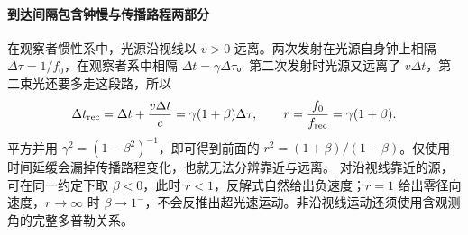 \paragraph{到达间隔包含钟慢与传播路程两部分}
在观察者惯性系中，光源沿视线以 $v>0$ 远离。两次发射在光源自身钟上相隔 $\Delta\tau=1/f_0$，在观察者系中相隔 $\Delta t=\gamma\Delta\tau$。第二次发射时光源又远离了 $v\Delta t$，第二束光还要多走这段路，所以
\[
 \Delta t_{\rm rec}=\Delta t+\frac{v\Delta t}{c}
 =\gamma(1+\beta)\Delta\tau,\qquad
 r=\frac{f_0}{f_{\rm rec}}=\gamma(1+\beta).
\]
平方并用 $\gamma^2=(1-\beta^2)^{-1}$，即可得到前面的 $r^2=(1+\beta)/(1-\beta)$。仅使用时间延缓会漏掉传播路程变化，也就无法分辨靠近与远离。
对沿视线靠近的源，可在同一约定下取 $\beta<0$，此时 $r<1$，反解式自然给出负速度；$r=1$ 给出零径向速度，$r\to\infty$ 时 $\beta\to1^-$，不会反推出超光速运动。非沿视线运动还须使用含观测角的完整多普勒关系。
